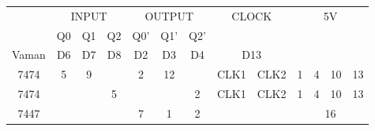 \begin{tabular}{|c|c|c|c|c|c|c|c|c|c|c|c|c|}      
\hline                              
\multirow{2}{*}{} & \multicolumn{3}{|c|}{INPUT} & \multicolumn{3}{|c|}{OUTPUT} & \multicolumn{2}{|c|}{\multirow{2}{*}{CLOCK}} & \multicolumn{4}{|c|}{\multirow{3}{*}{5V}} \\      
\cline{2-7}     
& Q0 & Q1 & Q2 & Q0' & Q1' & Q2' & \multicolumn{2}{|c|}{\multirow{2}{*}{}} & \multicolumn{4}{|c|}{} \\        
\hline          
Vaman & D6 & D7 & D8 & D2 & D3 & D4 & \multicolumn{2}{|c|}{D13} & \multicolumn{4}{|c|}{\multirow{3}{*}{}}\\                                   
\hline                             
7474 & 5 & 9 &  & 2 & 12 &  & CLK1 & CLK2 & 1 & 4 & 10 & 13 \\                   
\hline                     
7474 & & & 5 & & & 2 & CLK1 & CLK2 & 1 & 4  & 10 & 13 \\                       
\hline                         
7447 & \multicolumn{3}{|c|}{} & 7 & 1 & 2 & & & \multicolumn{4}{|c|}{16} \\              
\hline
\end{tabular}
